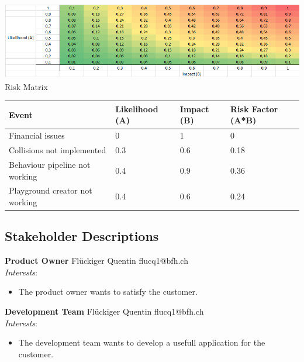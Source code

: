 \documentclass{scrartcl}
\begin{document}
\begin{center}
  \includegraphics[width=\textwidth]{./risk-matrix}\\
  Risk Matrix
\end{center}

\begin{tabular}{p{2cm} p{2cm} p{2cm} p{2cm}}
  Event & Likelihood (A) & Impact (B) & Risk Factor (A*B) \\ \hline
  Financial issues & 0 & 1 & 0 \\
  Collisions not implemented & 0.3 & 0.6 & 0.18 \\
  Behaviour pipeline not working & 0.4 & 0.9 & 0.36 \\
  Playground creator not working & 0.4 & 0.6 & 0.24 \\
\end{tabular}

\subsection{Stakeholder Descriptions}
\textbf{Product Owner}
Flückiger Quentin flucq1@bfh.ch \\
\textit{Interests}:
\begin{itemize}
  \item The product owner wants to satisfy the customer.
\end{itemize}


\textbf{Development Team}
Flückiger Quentin flucq1@bfh.ch \\
\textit{Interests}:
\begin{itemize}
  \item The development team wants to develop a usefull application for the customer.
\end{itemize}
\end{document}

